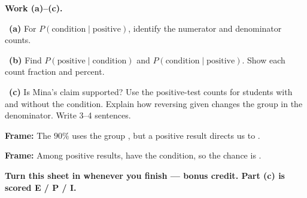 \documentclass[11pt]{article}
\begin{document}
\newpage
\textbf{Work (a)--(c).}\par\smallskip

~\textbf{(a)} For $P(\text{condition}\mid\text{positive})$, identify the numerator and denominator counts.\par
\workspace{0.7in}

~\textbf{(b)} Find $P(\text{positive}\mid\text{condition})$ and $P(\text{condition}\mid\text{positive})$. Show each count fraction and percent.\par
\workspace{1.3in}

~\textbf{(c)} Is Mina's claim supported? Use the positive-test counts for students with and without the condition. Explain how reversing given changes the group in the denominator. Write 3--4 sentences.\par
\workspace{2.0in}

\begin{sentenceframebox}\raggedright\textbf{Frame:} The $90\%$ uses the group \blank[1.6in], but a positive result directs us to \blank[1.8in].\end{sentenceframebox}

\begin{sentenceframebox}\raggedright\textbf{Frame:} Among \blank[0.6in] positive results, \blank[0.6in] have the condition, so the chance is \blank[0.8in].\end{sentenceframebox}

\textbf{Turn this sheet in whenever you finish --- bonus credit. Part (c) is scored E / P / I.}\par
\end{document}
